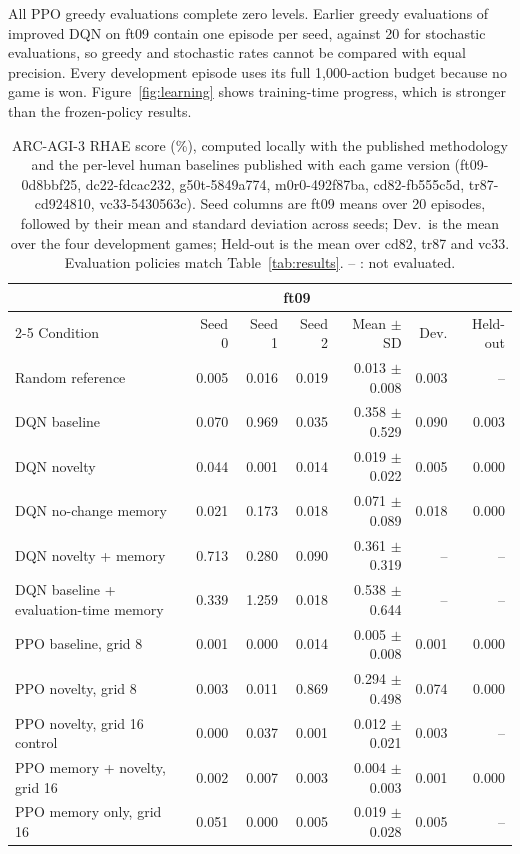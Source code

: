 \documentclass[10pt]{article}
\begin{document}
All PPO greedy evaluations complete zero levels. Earlier greedy evaluations of improved DQN on ft09 contain one episode per seed, against 20 for stochastic evaluations, so greedy and stochastic rates cannot be compared with equal precision. Every development episode uses its full 1,000-action budget because no game is won. Figure~\ref{fig:learning} shows training-time progress, which is stronger than the frozen-policy results.

\begin{table}[t]
\centering
\caption{ARC-AGI-3 RHAE score (\%), computed locally with the published methodology \citep{arc2026} and the per-level human baselines published with each game version (ft09-0d8bbf25, dc22-fdcac232, g50t-5849a774, m0r0-492f87ba, cd82-fb555c5d, tr87-cd924810, vc33-5430563c). Seed columns are ft09 means over 20 episodes, followed by their mean and standard deviation across seeds; Dev.\ is the mean over the four development games; Held-out is the mean over cd82, tr87 and vc33. Evaluation policies match Table~\ref{tab:results}. -- : not evaluated.}
\setlength{\tabcolsep}{3pt}\small
\begin{tabular}{lrrrrrr}
\toprule & \multicolumn{4}{c}{ft09} & & \\
\cmidrule(lr){2-5} Condition & Seed 0 & Seed 1 & Seed 2 & Mean $\pm$ SD & Dev. & Held-out \\
\midrule Random reference &0.005&0.016&0.019&0.013 $\pm$ 0.008&0.003&--\\
DQN baseline &0.070&0.969&0.035&0.358 $\pm$ 0.529&0.090&0.003\\
DQN novelty &0.044&0.001&0.014&0.019 $\pm$ 0.022&0.005&0.000\\
DQN no-change memory &0.021&0.173&0.018&0.071 $\pm$ 0.089&0.018&0.000\\
DQN novelty + memory &0.713&0.280&0.090&0.361 $\pm$ 0.319&--&--\\
DQN baseline + evaluation-time memory &0.339&1.259&0.018&0.538 $\pm$ 0.644&--&--\\
PPO baseline, grid 8 &0.001&0.000&0.014&0.005 $\pm$ 0.008&0.001&0.000\\
PPO novelty, grid 8 &0.003&0.011&0.869&0.294 $\pm$ 0.498&0.074&0.000\\
PPO novelty, grid 16 control &0.000&0.037&0.001&0.012 $\pm$ 0.021&0.003&--\\
PPO memory + novelty, grid 16 &0.002&0.007&0.003&0.004 $\pm$ 0.003&0.001&0.000\\
PPO memory only, grid 16 &0.051&0.000&0.005&0.019 $\pm$ 0.028&0.005&--\\
\bottomrule
\end{tabular}
\label{tab:rhae}
\end{table}
\end{document}
